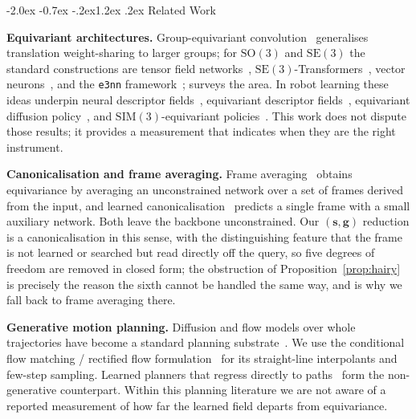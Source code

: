 \documentclass[10pt,twocolumn,letterpaper]{article}
\makeatletter
\renewcommand\section{\@startsection{section}{1}{\z@}%
  {-2.0ex \@plus -0.7ex \@minus -.2ex}{1.2ex \@plus.2ex}%
  {\centering\normalfont\large\bfseries}}
\theoremstyle{plain}
\newcommand{\svec}{\mathbf{s}}
\newcommand{\gvec}{\mathbf{g}}
\newcommand{\SE}{\mathrm{SE}(3)}
\newcommand{\SOth}{\mathrm{SO}(3)}
\makeatother
\begin{document}
\section{Related Work}

\textbf{Equivariant architectures.} Group-equivariant convolution~\cite{cohen2016gcnn}
generalises translation weight-sharing to larger groups; for $\SOth$ and $\SE$ the
standard constructions are tensor field networks~\cite{thomas2018tfn},
$\SE$-Transformers~\cite{fuchs2020se3t}, vector neurons~\cite{deng2021vn}, and the
\texttt{e3nn} framework~\cite{geiger2022e3nn}; \cite{bronstein2021gdl} surveys the
area. In robot learning these ideas underpin neural descriptor
fields~\cite{simeonov2022ndf}, equivariant descriptor fields~\cite{ryu2023edf},
equivariant diffusion policy~\cite{wang2024equidp}, and $\mathrm{SIM}(3)$-equivariant
policies~\cite{yang2024equibot}. This work does not dispute those results; it
provides a measurement that indicates when they are the right instrument.

\textbf{Canonicalisation and frame averaging.} Frame averaging~\cite{puny2022fa}
obtains equivariance by averaging an unconstrained network over a set of frames
derived from the input, and learned canonicalisation~\cite{kaba2023canon} predicts
a single frame with a small auxiliary network. Both leave the backbone
unconstrained. Our $(\svec,\gvec)$ reduction is a canonicalisation in this sense,
with the distinguishing feature that the frame is not learned or searched but read
directly off the query, so five degrees of freedom are removed in closed form; the
obstruction of Proposition~\ref{prop:hairy} is precisely the reason the sixth
cannot be handled the same way, and is why we fall back to frame averaging there.

\textbf{Generative motion planning.} Diffusion and flow models over whole
trajectories have become a standard planning
substrate~\cite{janner2022diffuser,chi2023dp,carvalho2023mpd,urain2023se3dif}. We
use the conditional flow matching / rectified flow
formulation~\cite{lipman2023fm,liu2023rectified,albergo2023interpolants} for its
straight-line interpolants and few-step sampling. Learned planners that regress
directly to paths~\cite{qureshi2019mpnet,fishman2022mpinets} form the
non-generative counterpart. Within this planning literature we are not aware of a
reported measurement of how far the learned field departs from equivariance.
\end{document}
